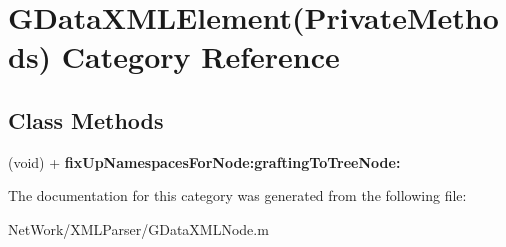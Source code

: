 \hypertarget{category_g_data_x_m_l_element_07_private_methods_08}{\section{G\+Data\+X\+M\+L\+Element(Private\+Methods) Category Reference}
\label{category_g_data_x_m_l_element_07_private_methods_08}
}
\subsection*{Class Methods}
\begin{DoxyCompactItemize}
\item 
\hypertarget{category_g_data_x_m_l_element_07_private_methods_08_a5f56aa547c9ba1abdc3d68e050a9b4e3}{(void) + {\bfseries fix\+Up\+Namespaces\+For\+Node\+:grafting\+To\+Tree\+Node\+:}}\label{category_g_data_x_m_l_element_07_private_methods_08_a5f56aa547c9ba1abdc3d68e050a9b4e3}

\end{DoxyCompactItemize}


The documentation for this category was generated from the following file\+:\begin{DoxyCompactItemize}
\item 
Net\+Work/\+X\+M\+L\+Parser/G\+Data\+X\+M\+L\+Node.\+m\end{DoxyCompactItemize}
